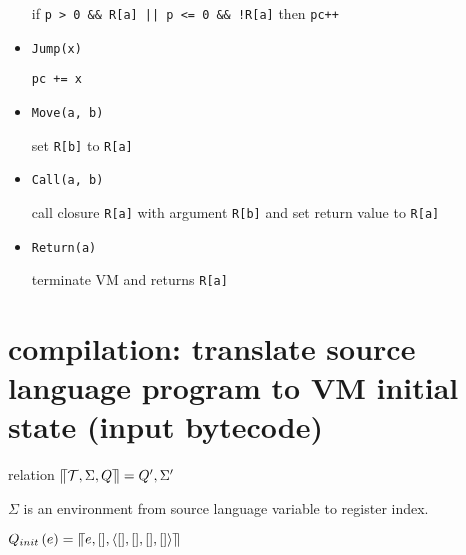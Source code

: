 \documentclass{article}
\begin{document}
\begin{multicols}{2}
\begin{itemize}
            if \texttt{p > 0 \&\& R[a] || p <= 0 \&\& !R[a]} then \texttt{pc++}

        \item \texttt{Jump(x)}

            \texttt{pc += x}
        \item \texttt{Move(a, b)}

            set \texttt{R[b]} to \texttt{R[a]}
        \item \texttt{Call(a, b)}

            call closure \texttt{R[a]} with argument \texttt{R[b]} and set return value to \texttt{R[a]}
        \item \texttt{Return(a)}

            terminate VM and returns \texttt{R[a]}
    \end{itemize}
\end{multicols}
\section{compilation: translate source language program to VM initial state (input bytecode)}
\begin{center}
    relation $\llceil\mathcal{T}, \Sigma, Q\rrceil = Q', \Sigma'$
\end{center}

$\Sigma$ is an environment from source language variable to register index.

$Q_{init}\left(e\right) = \llceil e, [], \left\langle [], [], [], []\right\rangle \rrceil$




\end{document}
